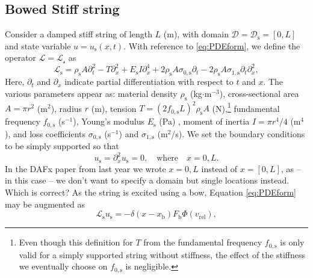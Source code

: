 \documentclass[dvipsnames, pdftex]{article}
\def\SBcomment[#1]{\textcolor{Red}{#1}}
\def\SWcomment[#1]{\textcolor{Bittersweet}{#1}}
\def\MDcomment[#1]{\textcolor{Blue}{#1}}
\begin{document}
\subsection{Bowed Stiff string}
Consider a damped stiff string of length $L$ (m), with domain $\mathcal{D} = \mathcal{D}_\text{s} = [0,L]$ and state variable $u = u_\text{s}(x,t)$.  %
With reference to \eqref{eq:PDEform}, we define the operator $\mathcal{L} = \mathcal{L_\text{s}}$ as
\begin{equation}
    \mathcal{L}_\text{s} = \rho_\text{s} A \partial_t^2 - T\partial_x^2 + E_\text{s}I\partial_x^4+2\rho_\text{s} A\sigma_{0,\text{s}}\partial_t-2\rho_\text{s} A\sigma_{1,\text{s}}\partial_t\partial_x^2,
\end{equation}
Here, $\partial_{t}$ and $\partial_{x}$ indicate partial differentiation with respect to $t$ and $x$. The various parameters appear as: material density $\rho_\text{s}$ (kg$\cdot$m$^{-3}$), cross-sectional area $A = \pi r^2$ (m$^2$), radius $r$ (m), tension $T = (2f_{0,\text{s}}L)^2\rho_\text{s}A$ (N),\footnote{Even though this definition for $T$ from the fundamental frequency $f_{0,\text{s}}$ is only valid for a simply supported string without stiffness, the effect of the stiffness we eventually choose on $f_{0,\text{s}}$ is negligible.} %
fundamental frequency $f_{0,\text{s}}$ (s$^{-1}$), Young's modulus $E_\text{s}$ (Pa) , moment of inertia $I=\pi r^4 / 4$ (m$^4$), and loss coefficients $\sigma_{0,\text{s}}$ (s$^{-1}$) and $\sigma_{1,\text{s}}$ (m$^2$/s). We set the boundary conditions to be simply supported so that
\begin{equation}\label{boundary}
    u_\text{s} = \partial_x^2u_\text{s} = 0, \quad \text{where} \quad x = 0, L.
\end{equation}
\SWcomment[In the DAFx paper from last year we wrote $x = 0, L$ instead of $x = {[}0, L{]}$, as -- in this case -- we don't want to specify a domain but single locations instead. Which is correct?]
As the string is excited using a bow, Equation \eqref{eq:PDEform} may be augmented as
\begin{equation}\label{eq:bowedString}
    \mathcal{L}_\text{s}u_\text{s} = -\delta(x-x_\text{b})F_\text{b}\Phi(v_\text{rel}),
\end{equation}
\end{document}
